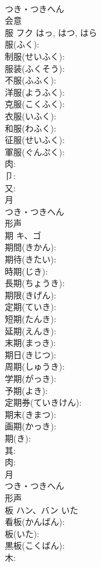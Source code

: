\documentclass[8pt]{extreport}
\begin{document}
\begin{CJK}{UTF8}{min}
\\	つき・つきへん	
\\	会意 
\\	服	フク		はっ, はつ, はら	
\\	服(ふく): 
\\	制服(せいふく): 
\\	服装(ふくそう): 
\\	不服(ふふく): 
\\	洋服(ようふく): 
\\	克服(こくふく): 
\\	衣服(いふく): 
\\	和服(わふく): 
\\	征服(せいふく): 
\\	軍服(ぐんぷく): 
\\	肉: 
\\	卩: 
\\	又: 
\\	月	
\\	つき・つきへん	
\\	形声 
\\	期	キ、ゴ			
\\	期間(きかん): 
\\	期待(きたい): 
\\	時期(じき): 
\\	長期(ちょうき): 
\\	期限(きげん): 
\\	定期(ていき): 
\\	短期(たんき): 
\\	延期(えんき): 
\\	末期(まっき): 
\\	期日(きじつ): 
\\	周期(しゅうき): 
\\	学期(がっき): 
\\	予期(よき): 
\\	定期券(ていきけん): 
\\	期末(きまつ): 
\\	画期(かっき): 
\\	期(き): 
\\	其: 
\\	肉: 
\\	月	
\\	つき・つきへん	
\\	形声 
\\	板	ハン、バン	いた		
\\	看板(かんばん): 
\\	板(いた): 
\\	黒板(こくばん): 
\\	木: 

\end{CJK}
\end{document}
